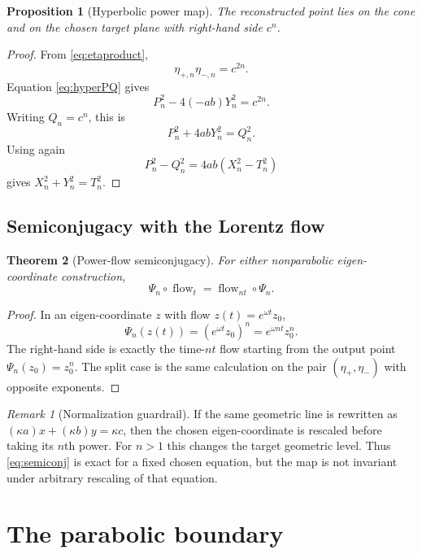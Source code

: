 \documentclass[11pt]{amsart}
\newtheorem{theorem}{Theorem}[section]
\newtheorem{proposition}[theorem]{Proposition}
\theoremstyle{remark}
\newtheorem*{remark}{Remark}
\begin{document}
\begin{proposition}[Hyperbolic power map]\label{prop:hyppower}
The reconstructed point lies on the cone and on the chosen target plane with right-hand side $c^n$.
\end{proposition}

\begin{proof}
From \eqref{eq:etaproduct},
\[
\eta_{+,n}\eta_{-,n}=c^{2n}.
\]
Equation \eqref{eq:hyperPQ} gives
\[
P_n^2-4(-ab)Y_n^2=c^{2n}.
\]
Writing $Q_n=c^n$, this is
\[
P_n^2+4abY_n^2=Q_n^2.
\]
Using again
\[
P_n^2-Q_n^2=4ab(X_n^2-T_n^2)
\]
gives $X_n^2+Y_n^2=T_n^2$.
\end{proof}

\subsection{Semiconjugacy with the Lorentz flow}

\begin{theorem}[Power-flow semiconjugacy]\label{thm:semiconj}
For either nonparabolic eigen-coordinate construction,
\begin{equation}\label{eq:semiconj}
\boxed{
\Psi_n\circ\operatorname{flow}_t
=\operatorname{flow}_{nt}\circ\Psi_n.
}
\end{equation}
\end{theorem}

\begin{proof}
In an eigen-coordinate $z$ with flow $z(t)=e^{\omega t}z_0$,
\[
\Psi_n(z(t))=(e^{\omega t}z_0)^n=e^{\omega nt}z_0^n.
\]
The right-hand side is exactly the time-$nt$ flow starting from the output point $\Psi_n(z_0)=z_0^n$.  The split case is the same calculation on the pair $(\eta_+,\eta_-)$ with opposite exponents.
\end{proof}

\begin{remark}[Normalization guardrail]
If the same geometric line is rewritten as $(\kappa a)x+(\kappa b)y=\kappa c$, then the chosen eigen-coordinate is rescaled before taking its $n$th power.  For $n>1$ this changes the target geometric level.  Thus \eqref{eq:semiconj} is exact for a fixed chosen equation, but the map is not invariant under arbitrary rescaling of that equation.
\end{remark}

\section{The parabolic boundary}
\end{document}
